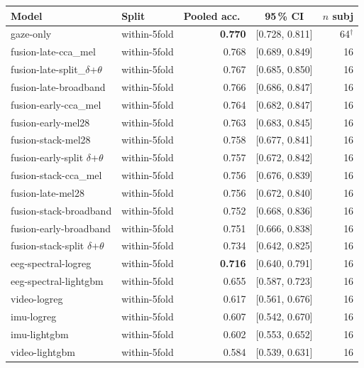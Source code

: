 \begin{table}[ht]
\centering
\begin{tabular}{llrcr}
\toprule
Model & Split & Pooled acc.\ & 95\,\% CI & $n$ subj \\
\midrule
gaze-only                              & within-5fold & \textbf{0.770} & [0.728, 0.811] & 64$^\dagger$ \\
fusion-late-cca\_mel                   & within-5fold & 0.768 & [0.689, 0.849] & 16 \\
fusion-late-split\_$\delta$+$\theta$ & within-5fold & 0.767 & [0.685, 0.850] & 16 \\
fusion-late-broadband                  & within-5fold & 0.766 & [0.686, 0.847] & 16 \\
fusion-early-cca\_mel                  & within-5fold & 0.764 & [0.682, 0.847] & 16 \\
fusion-early-mel28                     & within-5fold & 0.763 & [0.683, 0.845] & 16 \\
fusion-stack-mel28                     & within-5fold & 0.758 & [0.677, 0.841] & 16 \\
fusion-early-split $\delta$+$\theta$ & within-5fold & 0.757 & [0.672, 0.842] & 16 \\
fusion-stack-cca\_mel                  & within-5fold & 0.756 & [0.676, 0.839] & 16 \\
fusion-late-mel28                      & within-5fold & 0.756 & [0.672, 0.840] & 16 \\
fusion-stack-broadband                 & within-5fold & 0.752 & [0.668, 0.836] & 16 \\
fusion-early-broadband                 & within-5fold & 0.751 & [0.666, 0.838] & 16 \\
fusion-stack-split $\delta$+$\theta$ & within-5fold & 0.734 & [0.642, 0.825] & 16 \\
eeg-spectral-logreg                    & within-5fold & \textbf{0.716} & [0.640, 0.791] & 16 \\
eeg-spectral-lightgbm                  & within-5fold & 0.655 & [0.587, 0.723] & 16 \\
video-logreg                           & within-5fold & 0.617 & [0.561, 0.676] & 16 \\
imu-logreg                             & within-5fold & 0.607 & [0.542, 0.670] & 16 \\
imu-lightgbm                           & within-5fold & 0.602 & [0.553, 0.652] & 16 \\
video-lightgbm                         & within-5fold & 0.584 & [0.539, 0.631] & 16 \\

\end{tabular}
\end{table}
